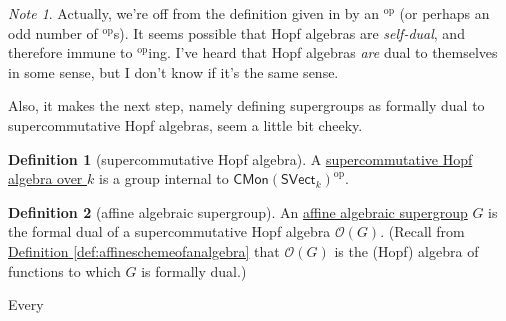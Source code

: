 \documentclass[a4paper]{report}
\newcommand{\defn}[1]{\ul{#1}}
\theoremstyle{definition}
\newtheorem{definition}{Definition}[section]
\theoremstyle{plain}
\theoremstyle{remark}
\newtheorem{note}{Note}[section]
\begin{document}
\begin{note}
  Actually, we're off from the definition given in \cite{milne-affine-group-schemes} by an $^{\mathrm{op}}$ (or perhaps an odd number of $^{\mathrm{op}}$s). It seems possible that Hopf algebras are \emph{self-dual}, and therefore immune to $^{\mathrm{op}}$ing. I've heard that Hopf algebras \emph{are} dual to themselves in some sense, but I don't know if it's the same sense.

  Also, it makes the next step, namely defining supergroups as formally dual to supercommutative Hopf algebras, seem a little bit cheeky.
\end{note}

\begin{definition}[supercommutative Hopf algebra]
  \label{def:supercommutativehopfalgebra}
  A \defn{supercommutative Hopf algebra over $k$} is a group internal to $\mathsf{CMon}(\mathsf{SVect}_{k})^{\mathrm{op}}$.
\end{definition}

\begin{definition}[affine algebraic supergroup]
  \label{def:affinealgebraicsupergroup}
  An \defn{affine algebraic supergroup} $G$ is the formal dual of a supercommutative Hopf algebra $\mathscr{O}(G)$. (Recall from \hyperref[def:affineschemeofanalgebra]{Definition \ref*{def:affineschemeofanalgebra}} that $\mathscr{O}(G)$ is the (Hopf) algebra of functions to which $G$ is formally dual.)
\end{definition}

Every 
\end{document}
